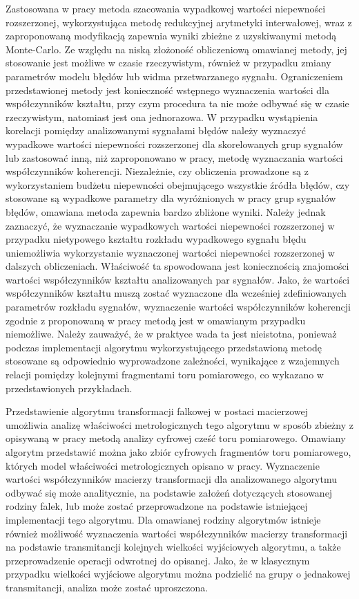 Zastosowana w pracy metoda szacowania wypadkowej wartości niepewności rozszerzonej, wykorzystująca metodę redukcyjnej arytmetyki interwałowej, wraz z zaproponowaną modyfikacją zapewnia wyniki zbieżne z uzyskiwanymi metodą Monte-Carlo. Ze względu na niską złożoność obliczeniową omawianej metody, jej stosowanie jest możliwe w czasie rzeczywistym, również w przypadku zmiany parametrów modelu błędów lub widma przetwarzanego sygnału. Ograniczeniem przedstawionej metody jest konieczność wstępnego wyznaczenia wartości dla współczynników kształtu, przy czym procedura ta nie może odbywać się w czasie rzeczywistym, natomiast jest ona jednorazowa. W przypadku wystąpienia korelacji pomiędzy analizowanymi sygnałami błędów należy wyznaczyć wypadkowe wartości niepewności rozszerzonej dla skorelowanych grup sygnałów lub zastosować inną, niż zaproponowano w pracy, metodę wyznaczania wartości współczynników koherencji. Niezależnie, czy obliczenia prowadzone są z wykorzystaniem budżetu niepewności obejmującego wszystkie źródła błędów, czy stosowane są wypadkowe parametry dla wyróżnionych w pracy grup sygnałów błędów, omawiana metoda zapewnia bardzo zbliżone wyniki. Należy jednak zaznaczyć, że wyznaczanie wypadkowych wartości niepewności rozszerzonej w przypadku nietypowego kształtu rozkładu wypadkowego sygnału błędu uniemożliwia wykorzystanie wyznaczonej wartości niepewności rozszerzonej w dalszych obliczeniach. Właściwość ta spowodowana jest koniecznością znajomości wartości współczynników kształtu analizowanych par sygnałów. Jako, że wartości współczynników kształtu muszą zostać wyznaczone dla wcześniej zdefiniowanych parametrów rozkładu sygnałów, wyznaczenie wartości współczynników koherencji zgodnie z proponowaną w pracy metodą jest w omawianym przypadku niemożliwe. Należy zauważyć, że w praktyce wada ta jest nieistotna, ponieważ podczas implementacji algorytmu wykorzystującego przedstawioną metodę stosowane są odpowiednio wyprowadzone zależności, wynikające z wzajemnych relacji pomiędzy kolejnymi fragmentami toru pomiarowego, co wykazano w przedstawionych przykładach.

Przedstawienie algorytmu transformacji falkowej w postaci macierzowej umożliwia analizę właściwości metrologicznych tego algorytmu w sposób zbieżny z opisywaną w pracy metodą analizy cyfrowej cześć toru pomiarowego. Omawiany algorytm przedstawić można jako zbiór cyfrowych fragmentów toru pomiarowego, których model właściwości metrologicznych opisano w pracy. Wyznaczenie wartości współczynników macierzy transformacji dla analizowanego algorytmu odbywać się może analitycznie, na podstawie założeń dotyczących stosowanej rodziny falek, lub może zostać przeprowadzone na podstawie istniejącej implementacji tego algorytmu. Dla omawianej rodziny algorytmów istnieje również możliwość wyznaczenia wartości współczynników macierzy transformacji na podstawie transmitancji kolejnych wielkości wyjściowych algorytmu, a także przeprowadzenie operacji odwrotnej do opisanej. Jako, że w klasycznym przypadku wielkości wyjściowe algorytmu można podzielić na grupy o jednakowej transmitancji, analiza może zostać uproszczona.

